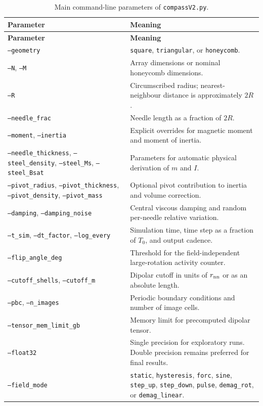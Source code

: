\documentclass[11pt,a4paper]{article}
\newcommand{\code}[1]{\texttt{#1}}
\begin{document}
\begin{longtable}{@{}p{4.4cm}p{10.4cm}@{}}
\caption{Main command-line parameters of \code{compassV2.py}.}\label{tab:cli}\\
\toprule
\textbf{Parameter} & \textbf{Meaning}\\
\midrule
\endfirsthead
\toprule
\textbf{Parameter} & \textbf{Meaning}\\
\midrule
\endhead
\bottomrule
\endfoot
\code{--geometry} & \code{square}, \code{triangular}, or \code{honeycomb}.\\
\code{--N}, \code{--M} & Array dimensions or nominal honeycomb dimensions.\\
\code{--R} & Circumscribed radius; nearest-neighbour distance is approximately $2R$.\\
\code{--needle\_frac} & Needle length as a fraction of $2R$.\\
\code{--moment}, \code{--inertia} & Explicit overrides for magnetic moment and moment of inertia.\\
\code{--needle\_thickness}, \code{--steel\_density}, \code{--steel\_Ms}, \code{--steel\_Bsat} & Parameters for automatic physical derivation of $m$ and $I$.\\
\code{--pivot\_radius}, \code{--pivot\_thickness}, \code{--pivot\_density}, \code{--pivot\_mass} & Optional pivot contribution to inertia and volume correction.\\
\code{--damping}, \code{--damping\_noise} & Central viscous damping and random per-needle relative variation.\\
\code{--t\_sim}, \code{--dt\_factor}, \code{--log\_every} & Simulation time, time step as a fraction of $T_0$, and output cadence.\\
\code{--flip\_angle\_deg} & Threshold for the field-independent large-rotation activity counter.\\
\code{--cutoff\_shells}, \code{--cutoff\_m} & Dipolar cutoff in units of $r_{\rm nn}$ or as an absolute length.\\
\code{--pbc}, \code{--n\_images} & Periodic boundary conditions and number of image cells.\\
\code{--tensor\_mem\_limit\_gb} & Memory limit for precomputed dipolar tensor.\\
\code{--float32} & Single precision for exploratory runs. Double precision remains preferred for final results.\\
\code{--field\_mode} & \code{static}, \code{hysteresis}, \code{forc}, \code{sine}, \code{step\_up}, \code{step\_down}, \code{pulse}, \code{demag\_rot}, or \code{demag\_linear}.\\

\end{longtable}
\end{document}
